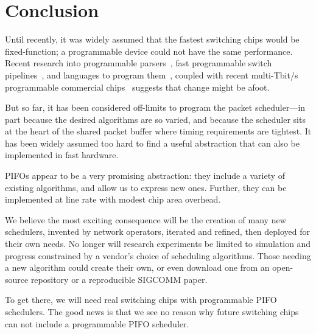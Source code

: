 \section{Conclusion}
\label{s:conclusion}

Until recently, it was widely assumed that the fastest switching chips would be
fixed-function; a programmable device could not have the same performance.
Recent research into programmable parsers~\cite{glen_parsing}, fast
programmable switch pipelines~\cite{rmt}, and languages to program
them~\cite{p4, pof}, coupled with recent multi-Tbit/s programmable commercial
chips~\cite{tofino, xpliant} suggests that change might be afoot.

But so far,
it has been considered off-limits to program the packet scheduler---in part
because the desired algorithms are so varied, and because the scheduler sits at
the heart of the shared packet buffer where timing requirements are tightest.
It has been widely assumed too hard to find a useful abstraction that can also
be implemented in fast hardware.

PIFOs appear to be a very promising abstraction: they include a variety of
existing algorithms, and allow us to express new ones. Further, they can be
implemented at line rate with modest chip area overhead.

We believe the most
exciting consequence will be the creation of many new schedulers, invented by
network operators, iterated and refined, then deployed for their own needs. No
longer will research experiments be limited to simulation and progress
constrained by a vendor's choice of scheduling algorithms. Those needing a new
algorithm could create their own, or even download one from an open-source
repository or a reproducible SIGCOMM paper.

To get there, we will need real switching chips with programmable PIFO
schedulers. The good news is that we see no reason why future switching chips
can not include a programmable PIFO scheduler.
